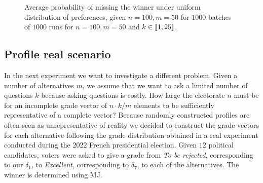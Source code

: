 	
	\begin{figure}
		\centering
		\caption{Average probability of missing the winner under uniform distribution of preferences, given $n=100, m=50$ for $1000$ batches of $1000$ runs for $n=100,m=50$ and $k\in \llbracket1,25\rrbracket$.}
		\label{fig:MJelicitationIC}
	\end{figure}
	
	\subsection{Profile real scenario}
	In the next experiment we want to investigate a different problem. Given a number of alternatives $m$, we assume that we want to ask a limited number of questions $k$ because asking questions is costly. How large the electorate $n$ must be for an incomplete grade vector of $n\cdot k/m$ elements to be sufficiently representative of a complete vector?
	Because randomly constructed profiles are often seen as unrepresentative of reality we decided to construct the grade vectors for each alternative following the grade distribution obtained in a real experiment conducted during the 2022 French presidential election.
	Given $12$ political candidates, voters were asked to give a grade from \textit{To be rejected}, corresponding to our $\delta_1$, to \textit{Excellent}, corresponding to $\delta_7$, to each of the alternatives. The winner is determined using \ac{MJ}.
	
